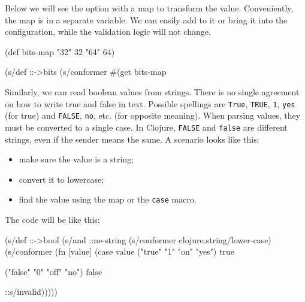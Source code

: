 \fi


Below we will see the option with a map to transform the value. Conveniently, the map is in a separate variable. We can easily add to it or bring it into the configuration, while the validation logic will not change.

\begin{english}
  \begin{clojure}
(def bits-map {"32" 32 "64" 64})

(s/def ::->bits
  (s/conformer
   #(get bits-map %
  \end{clojure}
\end{english}

Similarly, we can read boolean values from strings. There is no single agreement on how to write true and false in text. Possible spellings are \verb|True|, \verb|TRUE|, \verb|1|, \verb|yes| (for true) and \verb|FALSE|, \verb|no|, etc. (for opposite meaning). When parsing values, they must be converted to a single case. In Clojure, \verb|FALSE| and \verb|false| are different strings, even if the sender means the same. A scenario looks like this:

\begin{itemize}

\item
  make sure the value is a string;

\item
  convert it to lowercase;

\item
  find the value using the map or the \verb|case| macro.

\end{itemize}

\noindent
The code will be like this:

\ifx\DEVICETYPE\MOBILE

\begin{english}
  \begin{clojure}
(s/def ::->bool
  (s/and
   ::ne-string
   (s/conformer
     clojure.string/lower-case)
   (s/conformer
    (fn [value]
      (case value
        ("true" "1" "on" "yes")
        true

        ("false" "0" "off" "no")
        false

        ::s/invalid)))))

  \end{clojure}
\end{english}

